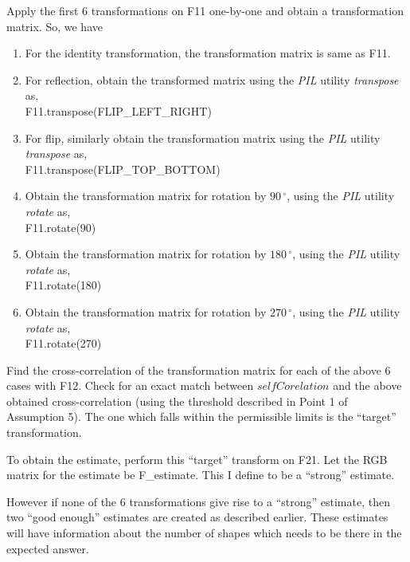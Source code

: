 \documentclass[10pt, letter]{article}
\begin{document}
Apply the first 6 transformations on F11 one-by-one and obtain a transformation matrix. So, we have
\begin{enumerate}
	\item For the identity transformation, the transformation matrix is same as F11.
	\item For reflection, obtain the transformed matrix using the \emph{PIL} utility \emph{transpose} \cite{pil} as,\\
		\hspace*{3cm}F11.transpose(FLIP\_LEFT\_RIGHT)
	\item For flip, similarly obtain the transformation matrix using the \emph{PIL} utility \emph{transpose} \cite{pil} as,\\
		\hspace*{3cm}F11.transpose(FLIP\_TOP\_BOTTOM)
	\item Obtain the transformation matrix for rotation by $90\,^{\circ}$, using the \emph{PIL} utility \emph{rotate} \cite{pil} as,\\
		\hspace*{3cm}F11.rotate(90)
	\item Obtain the transformation matrix for rotation by $180\,^{\circ}$, using the \emph{PIL} utility \emph{rotate} \cite{pil} as,\\
		\hspace*{3cm}F11.rotate(180)
	\item Obtain the transformation matrix for rotation by $270\,^{\circ}$, using the \emph{PIL} utility \emph{rotate} \cite{pil} as,\\
		\hspace*{3cm}F11.rotate(270)		
\end{enumerate}
Find the cross-correlation of the transformation matrix for each of the above 6 cases with F12. Check for an exact match between $selfCorelation$ and the above obtained cross-correlation (using the threshold described in Point 1 of Assumption 5). The one which falls within the permissible limits is the ``target'' transformation.

To obtain the estimate, perform this ``target'' transform on F21. Let the RGB matrix for the estimate be F\_estimate. This I define to be a ``strong'' estimate.

However if none of the 6 transformations give rise to a ``strong'' estimate, then two ``good enough'' estimates are created as described earlier. These estimates will have information about the number of shapes which needs to be there in the expected answer.
\end{document}
